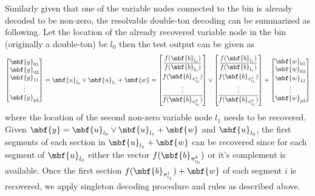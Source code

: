 \documentclass[conference,twocolumn]{IEEEtran}
\begin{document}
Similarly given that one of the variable nodes connected to the bin is already decoded to be non-zero, the resolvable double-ton decoding can be summarized as following. Let the location of the already recovered variable node in the bin (originally a double-ton) be $l_0$ then the test output can be given as 
\begin{align*}
\begin{bmatrix}
\mbf{y}_{01}\\
\mbf{y}_{02}\\
\mbf{y}_{11}\\
\vdots \\
\mbf{y}_{p2}\\
\end{bmatrix}
=\mbf{u}_{l_0} \vee \mbf{u}_{l_1}+\mbf{w}=
\begin{bmatrix}
f(\mbf{b}_{l_0})\\
\vspace{2pt}
\overline{f(\mbf{b}_{l_0})}\\
f(\mbf{b}_{\pi^1_{l_0}})\\
\vdots \\
\overline{f(\mbf{b}_{\pi^{p}_{l_0}})}\\
\end{bmatrix} 
\vee
\begin{bmatrix}
f(\mbf{b}_{l_1})\\
\vspace{2pt}
\overline{f(\mbf{b}_{l_1})}\\
f(\mbf{b}_{\pi^1_{l_1}})\\
\vdots \\
\overline{f(\mbf{b}_{\pi^{p}_{l_1}})}\\
\end{bmatrix}+
\begin{bmatrix}
\mbf{w}_{01}\\
\vspace{2pt}
\mbf{w}_{02}\\
\mbf{w}_{11}\\
\vdots \\
\mbf{w}_{p2}\\
\end{bmatrix}
\end{align*} 
where the location of the second non-zero variable node $l_1$ needs to be recovered. Given $\mbf{y}=\mbf{u}_{l_0} \vee \mbf{u}_{l_1}+\mbf{w}$ and $\mbf{u}_{l_0}$, the first segments of each section in $\mbf{u}_{l_1}+\mbf{w}$ can be recovered since for each segment of $\mbf{u}_{l_0}$ either the vector $f(\mbf{b}_{\pi^k_{l_0}})$ or it's complement is available. Once the first section $f(\mbf{b}_{\pi_{l_1}^i})+\mbf{w}$ of each segment $i$ is recovered, we apply singleton decoding procedure and rules as described above.
\end{document}
